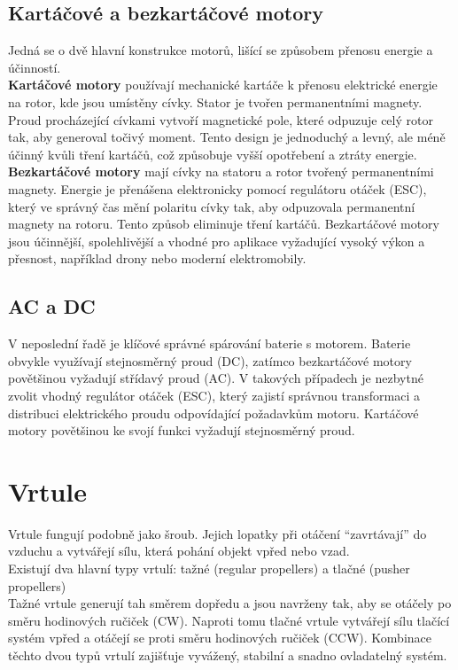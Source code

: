 \documentclass[12pt]{report}
\begin{document}
\subsection{Kartáčové a bezkartáčové motory}
Jedná se o dvě hlavní konstrukce motorů, lišící se způsobem přenosu energie a účinností.\\
\textbf{Kartáčové motory} používají mechanické kartáče k přenosu elektrické energie na rotor, kde jsou umístěny cívky. Stator je tvořen permanentními magnety. Proud procházející cívkami vytvoří magnetické pole, které odpuzuje celý rotor tak, aby generoval točivý moment. Tento design je jednoduchý a levný, ale méně účinný kvůli tření kartáčů, což způsobuje vyšší opotřebení a ztráty energie.\\
\textbf{Bezkartáčové motory} mají cívky na statoru a rotor tvořený permanentními magnety. Energie je přenášena elektronicky pomocí regulátoru otáček (ESC), který ve správný čas mění polaritu cívky tak, aby odpuzovala permanentní magnety na rotoru. Tento způsob eliminuje tření kartáčů. Bezkartáčové motory jsou účinnější, spolehlivější a vhodné pro aplikace vyžadující vysoký výkon a přesnost, například drony nebo moderní elektromobily.

\subsection{AC a DC}
V neposlední řadě je klíčové správné spárování baterie s motorem. Baterie obvykle využívají stejnosměrný proud (DC), zatímco bezkartáčové motory povětšinou vyžadují střídavý proud (AC). V takových případech je nezbytné zvolit vhodný regulátor otáček (ESC), který zajistí správnou transformaci a distribuci elektrického proudu odpovídající požadavkům motoru.  Kartáčové motory povětšinou ke svojí funkci vyžadují stejnosměrný proud. \cite{mainbook} \cite{dojo} \cite{ultimateguide} \cite{motors}

\section{Vrtule}

Vrtule fungují podobně jako šroub. Jejich lopatky při otáčení “zavrtávají” do vzduchu a vytvářejí sílu, která pohání objekt vpřed nebo vzad.\\
Existují dva hlavní typy vrtulí: tažné (regular propellers) a tlačné (pusher propellers)\\
Tažné vrtule generují tah směrem dopředu a jsou navrženy tak, aby se otáčely po směru hodinových ručiček (CW). Naproti tomu tlačné vrtule vytvářejí sílu tlačící systém vpřed a otáčejí se proti směru hodinových ručiček (CCW). Kombinace těchto dvou typů vrtulí zajišťuje vyvážený, stabilní a snadno ovladatelný systém. \cite{mainbook} \cite{dojo}
\end{document}
